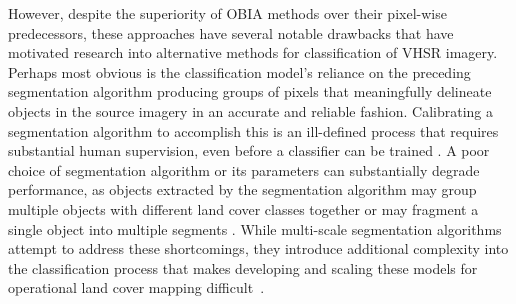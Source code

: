 However, despite the superiority of OBIA methods over their pixel-wise predecessors, these approaches have several notable drawbacks that have motivated research into alternative methods for classification of VHSR imagery.
Perhaps most obvious is the classification model's reliance on the preceding segmentation algorithm producing groups of pixels that meaningfully delineate objects in the source imagery in an accurate and reliable fashion.
Calibrating a segmentation algorithm to accomplish this is an ill-defined process that requires substantial human supervision, even before a classifier can be trained \citep{maReviewSupervisedObjectbased2017}.
A poor choice of segmentation algorithm or its parameters can substantially degrade performance, as objects extracted by the segmentation algorithm may group multiple objects with different land cover classes together or may fragment a single object into multiple segments \citep{hossainSegmentationObjectBasedImage2019}.
While multi-scale segmentation algorithms attempt to address these shortcomings, they introduce additional complexity into the classification process that makes developing and scaling these models for operational land cover mapping difficult~\citep{dragutAutomatedParameterisationMultiscale2014, mingScaleParameterSelection2015,haoSegmentationScaleEffect2021}.

